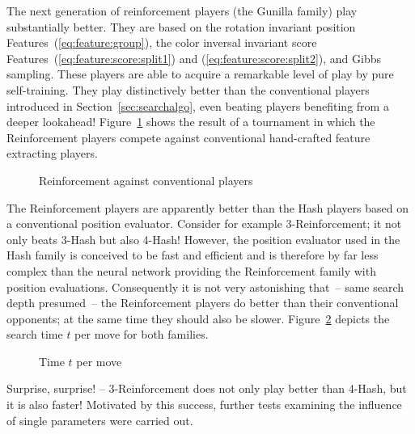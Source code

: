 The next generation of reinforcement players (the \textsf{Gunilla} family) play substantially better. They are based on the rotation invariant position Features~(\ref{eq:feature:group}), the color inversal invariant score Features~(\ref{eq:feature:score:split1}) and (\ref{eq:feature:score:split2}), and Gibbs sampling. These players are able to acquire a remarkable level of play by pure self-training. They play distinctively better than the conventional players introduced in Section~\ref{sec:searchalgo}, even beating players benefiting from a deeper lookahead! Figure~\ref{fig:experim:neuro:won} shows the result of a tournament in which the Reinforcement players compete against conventional hand-crafted feature extracting players. 
\begin{figure}[htbp]
\begin{center}
\caption{Reinforcement against conventional players}
\label{fig:experim:neuro:won}
\small
\medskip

\end{center}
\end{figure}

The Reinforcement players are apparently better than the Hash players based on a conventional position evaluator. Consider for example 3-Reinforcement; it not only beats 3-Hash but also 4-Hash! However, the position evaluator used in the Hash family is conceived to be fast and efficient and is therefore by far less complex than the neural network providing the Reinforcement family with position evaluations. Consequently it is not very astonishing that~-- same search depth presumed~-- the Reinforcement players do better than their conventional opponents; at the same time they should also be slower. Figure~\ref{fig:experim:neuro:time} depicts the search time $t$ per move for both families.

\begin{figure}[htbp]
\begin{center}
\caption{Time $t$ per move}
\label{fig:experim:neuro:time}
\small \medskip

\end{center}
\end{figure}
Surprise, surprise! -- 3-Reinforcement does not only play better than 4-Hash, but it is also faster! Motivated by this success, further tests examining the influence of single parameters were carried out. 

